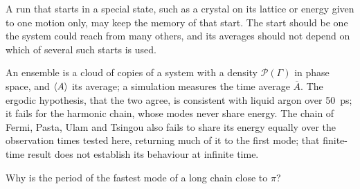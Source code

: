\begin{practice}
A run that starts in a special state, such as a crystal on its lattice or
energy given to one motion only, may keep the memory of that start. The
start should be one the system could reach from many others, and its
averages should not depend on which of several such starts is used.
\end{practice}

\begin{keyidea}
An ensemble is a cloud of copies of a system with a density $\mathcal{P}(\Gamma)$
in phase space, and $\langle A \rangle$ its average; a simulation measures the time
average $\overline{A}$. The ergodic hypothesis, that the two agree, is
consistent with liquid argon over \SI{50}{\pico\second}; it fails for the
harmonic chain, whose modes never share energy. The chain of Fermi,
Pasta, Ulam and Tsingou also fails to share its energy equally over the
observation times tested here, returning much of it to the first mode;
that finite-time result does not establish its behaviour at infinite time.
\end{keyidea}


\begin{selfcheck}
Why is the period of the fastest mode of a long chain close to $\pi$?
\end{selfcheck}
